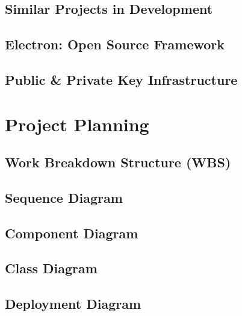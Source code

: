\documentclass[12pt]{article}
\begin{document}
	\subsection{Similar Projects in Development}
		\lipsum[1]
	\subsection{Electron: Open Source Framework}
		\lipsum[1]
	\subsection{Public \& Private Key Infrastructure}
		\lipsum[1]
\pagebreak
\section{Project Planning}
	\lipsum[1]
	\pagebreak
	\subsection{Work Breakdown Structure (WBS)}
	\lipsum[1]
	\pagebreak
	\subsection{Sequence Diagram}
	\lipsum[1]
	\pagebreak
	\subsection{Component Diagram}
	\lipsum[1]
	\pagebreak
	\subsection{Class Diagram}
	\lipsum[1]
	\pagebreak
	\subsection{Deployment Diagram}
	\lipsum[1]
\pagebreak


\end{document}
